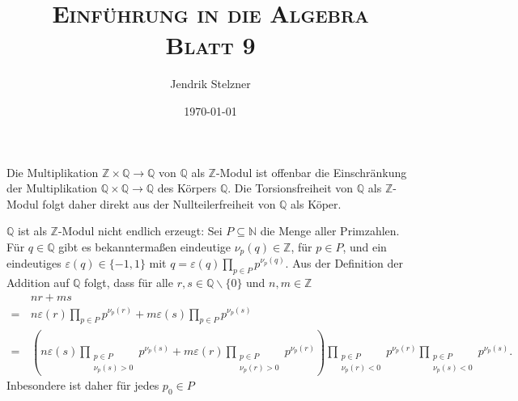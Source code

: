 \documentclass[a4paper,10pt]{article}
\title{\textsc{Einführung in die Algebra \\ \Large Blatt 9}}
\author{Jendrik Stelzner}
\date{\today}
\theoremstyle{definition}
\newcommand{\N}{\mathbb{N}}
\newcommand{\Z}{\mathbb{Z}}
\newcommand{\Q}{\mathbb{Q}}
\begin{document}
\maketitle





\section{}
Die Multiplikation $\Z \times \Q \rightarrow \Q$ von $\Q$ als $\Z$-Modul ist offenbar die Einschränkung der Multiplikation $\Q \times \Q \rightarrow \Q$ des Körpers $\Q$. Die Torsionsfreiheit von $\Q$ als $\Z$-Modul folgt daher direkt aus der Nullteilerfreiheit von $\Q$ als Köper.

$\Q$ ist als $\Z$-Modul nicht endlich erzeugt: Sei $P \subseteq \N$ die Menge aller Primzahlen. Für $q \in \Q$ gibt es bekanntermaßen eindeutige $\nu_p(q) \in \Z$, für $p \in P$, und ein eindeutiges $\varepsilon(q) \in \{-1,1\}$ mit $q = \varepsilon(q) \prod_{p \in P} p^{\nu_p(q)}$. Aus der Definition der Addition auf $\Q$ folgt, dass für alle $r,s \in \Q \smallsetminus \{0\}$ und $n,m \in \Z$
\begin{align*}
  &\,n r + m s \\
 =&\, n \varepsilon(r)\prod_{p \in P} p^{\nu_p(r)} + m \varepsilon(s)\prod_{p \in P} p^{\nu_p(s)} \\
 =&\,  \left( n \varepsilon(s) \prod_{\substack{p \in P \\ \nu_p(s) > 0}} p^{\nu_p(s)}
            + m \varepsilon(r) \prod_{\substack{p \in P \\ \nu_p(r) > 0}} p^{\nu_p(r)}
     \right)
     \prod_{\substack{p \in P \\ \nu_p(r) < 0}} p^{\nu_p(r)} \prod_{\substack{p \in P \\ \nu_p(s) < 0}} p^{\nu_p(s)}.
\end{align*}
Inbesondere ist daher für jedes $p_0 \in P$
\end{document}

